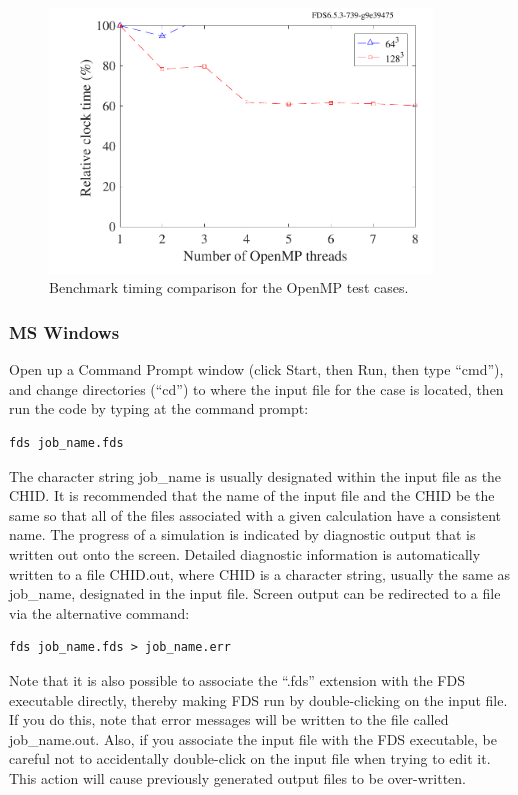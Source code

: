 \documentclass[11pt]{book}
\begin{document}
\begin{figure}[ht!]
\centering
\includegraphics[width=4.0in]{SCRIPT_FIGURES/openmp_timing_benchmarks}
\caption[OpenMP timings]{Benchmark timing comparison for the OpenMP test cases.}
\label{fig:openmp_timing_benchmarks}
\end{figure}


\subsubsection{MS Windows}

Open up a Command Prompt window (click Start, then Run, then type ``cmd''), and change directories (``cd'') to where the input file for the case is located, then run the code by typing at the command prompt:
\begin{lstlisting}
fds job_name.fds
\end{lstlisting}
The character string {\ct job\_name} is usually designated within the input file as the {\ct CHID}. It is recommended that the name of the input file and the {\ct CHID} be the same so that all of the files associated with a given calculation have a consistent name.  The progress of a simulation is indicated by diagnostic output that is written out onto the screen. Detailed diagnostic information is automatically written to a file {\ct CHID.out}, where {\ct CHID} is a character string, usually the same as {\ct job\_name}, designated in the input file. Screen output can be redirected to a file via the alternative command:
\begin{lstlisting}
fds job_name.fds > job_name.err
\end{lstlisting}
Note that it is also possible to associate the ``.fds'' extension with the FDS executable directly, thereby making FDS run by double-clicking on the input file. If you do this, note that error messages will be written to the file called {\ct job\_name.out}. Also, if you associate the input file with the FDS executable, be careful not to accidentally double-click on the input file when trying to edit it. This action will cause previously generated output files to be over-written.
\end{document}
